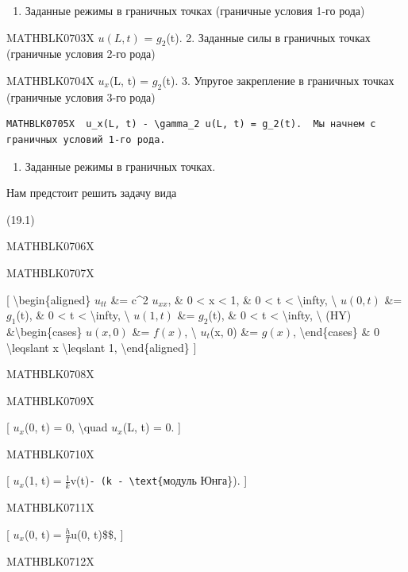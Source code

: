\documentclass[
]{article}
\providecommand{\tightlist}{%
  \setlength{\itemsep}{0pt}\setlength{\parskip}{0pt}}
\begin{document}
{{\begin{enumerate}
\def\labelenumi{\arabic{enumi}.}
\tightlist
\item
  Заданные режимы в граничных точках (граничные условия 1-го рода)
\end{enumerate}

MATHBLK0703X \(u(L, t)\) = \(g_2\)(t). 2. Заданные силы в граничных
точках (граничные условия 2-го рода)

MATHBLK0704X \(u_x\)(L, t) = \(g_2\)(t). 3. Упругое закрепление в
граничных точках (граничные условия 3-го рода)

\begin{verbatim}
MATHBLK0705X  u_x(L, t) - \gamma_2 u(L, t) = g_2(t).  Мы начнем с граничных условий 1-го рода.
\end{verbatim}

\begin{enumerate}
\def\labelenumi{\arabic{enumi}.}
\tightlist
\item
  Заданные режимы в граничных точках.
\end{enumerate}

Нам предстоит решить задачу вида

(19.1)

MATHBLK0706X

MATHBLK0707X

{[} \textbackslash begin\{aligned\} \(u_{tt}\) \&= c\^{}2 \(u_{xx}\), \&
0 \textless{} x \textless{} 1, \& 0 \textless{} t \textless{}
\textbackslash infty, \textbackslash{} \(u(0, t)\) \&= \(g_1\)(t), \& 0
\textless{} t \textless{} \textbackslash infty, \textbackslash{}
\(u(1, t)\) \&= \(g_2\)(t), \& 0 \textless{} t \textless{}
\textbackslash infty, \textbackslash{} (HY)
\&\textbackslash begin\{cases\} \(u(x, 0)\) \&= \(f(x)\),
\textbackslash{} \(u_t\)(x, 0) \&= \(g(x)\), \textbackslash end\{cases\}
\& 0 \textbackslash leqslant x \textbackslash leqslant 1,
\textbackslash end\{aligned\} {]}

MATHBLK0708X

MATHBLK0709X

{[} \(u_x\)(0, t) = 0, \textbackslash quad \(u_x\)(L, t) = 0. {]}

MATHBLK0710X

{[} \(u_{x}\)(1,
t)\(= \frac{1}{k}\)v(t)\texttt{-\ (k\ -\ \textbackslash{}text\{}модуль
Юнга\}). {]}

MATHBLK0711X

{[} \(u_{x}\)(0, t)\(= \frac{h}{T}\)u(0, t)\$\$, {]}

MATHBLK0712X

}}
\end{document}

